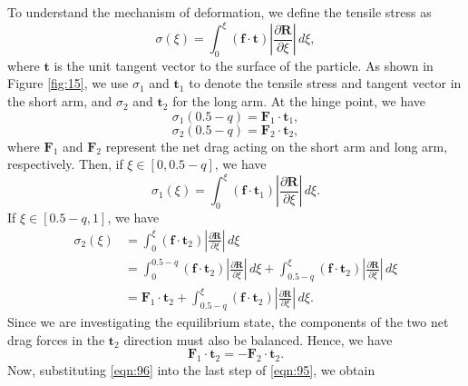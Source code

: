 \documentclass[a4paper,12pt]{report}
\begin{document}
\newpage
To understand the mechanism of deformation, we define the tensile stress as 
\begin{equation}
	\label{eqn:91}
	\sigma(\xi)=\int_0^\xi (\mathbf{f}\cdot\mathbf{t}) \left |\frac{\partial \mathbf{R}}{\partial \xi}\right|\,d\xi,
\end{equation}
where $\mathbf{t}$ is the unit tangent vector to the surface of the particle. As shown in Figure \ref{fig:15}, we use $\sigma_1$ and $\mathbf{t}_1$ to denote the tensile stress and tangent vector in the short arm, and $\sigma_2$ and $\mathbf{t}_2$ for the long arm. At the hinge point, we have 
\begin{equation}
	\label{eqn:92}
	\sigma_1(0.5-q)=\mathbf{F}_1\cdot\mathbf{t}_1, 
\end{equation}
\begin{equation}
	\label{eqn:93}
	\sigma_2(0.5-q)=\mathbf{F}_2\cdot\mathbf{t}_2, 
\end{equation}
where $\mathbf{F}_1$ and $\mathbf{F}_2$ represent the net drag acting on the short arm and long arm, respectively. Then, if $\xi \in [0,0.5-q]$, we have 
\begin{equation}
	\label{eqn:94}
	\sigma_1(\xi)= \int_0^\xi (\mathbf{f}\cdot\mathbf{t}_1) \left |\frac{\partial \mathbf{R}}{\partial \xi}\right|\,d\xi.
\end{equation}
If $\xi \in [0.5-q,1]$, we have
\begin{equation}
	\label{eqn:95}
	\begin{aligned}
		\sigma_2(\xi)&= \int_0^\xi (\mathbf{f}\cdot\mathbf{t}_2) \left |\frac{\partial \mathbf{R}}{\partial \xi}\right|\,d\xi\\
		&=\int_0^{0.5-q} (\mathbf{f}\cdot\mathbf{t}_2) \left |\frac{\partial \mathbf{R}}{\partial \xi}\right|\,d\xi+\int_{0.5-q}^\xi (\mathbf{f}\cdot\mathbf{t}_2) \left |\frac{\partial \mathbf{R}}{\partial \xi}\right|\,d\xi\\
		&=\mathbf{F}_1\cdot\mathbf{t}_2+\int_{0.5-q}^\xi (\mathbf{f}\cdot\mathbf{t}_2) \left |\frac{\partial \mathbf{R}}{\partial \xi}\right|\,d\xi.
	\end{aligned}
\end{equation}
Since we are investigating the equilibrium state, the components of the two net drag forces in the $\mathbf{t}_2$ direction must also be balanced. Hence, we have 
\begin{equation}
	\label{eqn:96}
	\mathbf{F}_1\cdot\mathbf{t}_2=-\mathbf{F}_2\cdot\mathbf{t}_2.
\end{equation}
Now, substituting \eqref{eqn:96} into the last step of \eqref{eqn:95}, we obtain 
\end{document}
